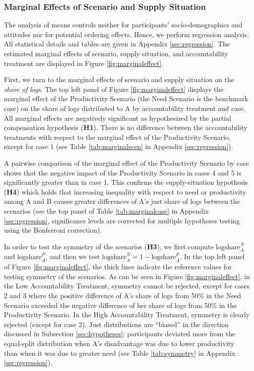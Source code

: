 \documentclass[smallcondensed]{svjour3}
\begin{document}
\subsubsection*{Marginal Effects of Scenario and Supply Situation}
%
The analysis of means controls neither for participants' socio-demographics and attitudes nor for potential ordering effects. Hence, we perform regression analysis. All statistical details and tables are given in Appendix \ref{sec:regression}. The estimated marginal effects of scenario, supply situation, and accountability treatment are displayed in Figure \ref{fig:marginaleffect}.\par
%
First, we turn to the marginal effects of scenario and supply situation on the \textit{share of logs}. The top left panel of Figure \ref{fig:marginaleffect} displays the marginal effect of the Productivity Scenario (the Need Scenario is the benchmark case) on the share of logs distributed to A by accountability treatment and case. All marginal effects are negatively significant as hypothesized by the partial compensation hypothesis (\textbf{H1}). There is no difference between the accountability treatments with respect to the marginal effect of the Productivity Scenario, except for case 1 (see Table \ref{tab:marginalscen} in Appendix \ref{sec:regression}).\par
%
A pairwise comparison of the marginal effect of the Productivity Scenario by case shows that the negative impact of the Productivity Scenario in cases 4 and 5 is significantly greater than in case 1. This confirms the supply-situation hypothesis (\textbf{H4}) which holds that increasing inequality with respect to need or productivity among A and B causes greater differences of A's just share of logs between the scenarios (see the top panel of Table \ref{tab:marginalcase} in Appendix \ref{sec:regression}, significance levels are corrected for multiple hypotheses testing using the Bonferroni correction).\par
%
In order to test the symmetry of the scenarios (\textbf{H3}), we first compute $\mbox{logshare}_A^N$ and $\mbox{logshare}_A^P$, and then we test $\mbox{logshare}_A^N=1-\mbox{logshare}_A^P$. In the top left panel of Figure \ref{fig:marginaleffect}, the thick lines indicate the reference values for testing symmetry of the scenarios. As can be seen in Figure \ref{fig:marginaleffect}, in the Low Accountability Treatment, symmetry cannot be rejected, except for cases 2 and 3 where the positive difference of A's share of logs from 50\% in the Need Scenario exceeded the negative difference of her share of logs from 50\% in the Productivity Scenario. In the High Accountability Treatment, symmetry is clearly rejected (except for case 2). Just distributions are ``biased'' in the direction discussed in Subsection \ref{sec:hypotheses}; participants deviated more from the equal-split distribution when A's disadvantage was due to lower productivity than when it was due to greater need (see Table \ref{tab:symmetry} in Appendix \ref{sec:regression}).\par
\end{document}
